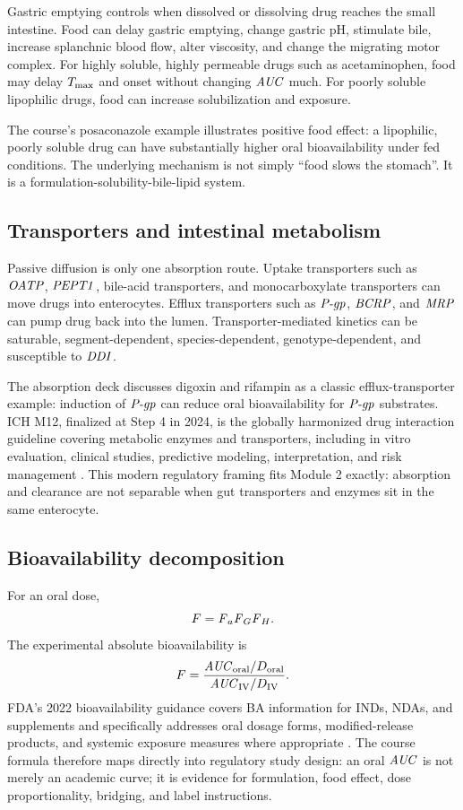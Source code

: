 \documentclass[a4paper]{article}
\newcommand{\AUC}{\ensuremath{\pksym{AUC}}}
\newcommand{\Tmax}{\ensuremath{T_{\pklab{max}}}}
\newcommand{\Fa}{\ensuremath{\pksym{F}_a}}
\newcommand{\Fg}{\ensuremath{\pksym{F}_G}}
\newcommand{\Fh}{\ensuremath{\pksym{F}_H}}
\newcommand{\Fbio}{\ensuremath{F}}
\newcommand{\DDI}{\ensuremath{\pksym{DDI}}}
\newcommand{\Pgp}{\ensuremath{\pksym{P-gp}}}
\newcommand{\OATP}{\ensuremath{\pksym{OATP}}}
\newcommand{\PEPT}{\ensuremath{\pksym{PEPT1}}}
\begin{document}
Gastric emptying controls when dissolved or dissolving drug reaches the small intestine. Food can delay gastric emptying, change gastric pH, stimulate bile, increase splanchnic blood flow, alter viscosity, and change the migrating motor complex. For highly soluble, highly permeable drugs such as acetaminophen, food may delay \(\Tmax\) and onset without changing \(\AUC\) much. For poorly soluble lipophilic drugs, food can increase solubilization and exposure.

The course's posaconazole example illustrates positive food effect: a lipophilic, poorly soluble drug can have substantially higher oral bioavailability under fed conditions. The underlying mechanism is not simply ``food slows the stomach''. It is a formulation-solubility-bile-lipid system.

\subsection{Transporters and intestinal metabolism}

Passive diffusion is only one absorption route. Uptake transporters such as \(\OATP\), \(\PEPT\), bile-acid transporters, and monocarboxylate transporters can move drugs into enterocytes. Efflux transporters such as \(\Pgp\), \(\pksym{BCRP}\), and \(\pksym{MRP}\) can pump drug back into the lumen. Transporter-mediated kinetics can be saturable, segment-dependent, species-dependent, genotype-dependent, and susceptible to \DDI{}.

The absorption deck discusses digoxin and rifampin as a classic efflux-transporter example: induction of \(\Pgp\) can reduce oral bioavailability for \(\Pgp\) substrates. ICH M12, finalized at Step 4 in 2024, is the globally harmonized drug interaction guideline covering metabolic enzymes and transporters, including in vitro evaluation, clinical studies, predictive modeling, interpretation, and risk management \cite{ichM12Ddi2024}. This modern regulatory framing fits Module 2 exactly: absorption and clearance are not separable when gut transporters and enzymes sit in the same enterocyte.

\subsection{Bioavailability decomposition}

For an oral dose,
\[
  \Fbio=\Fa\Fg\Fh.
\]
The experimental absolute bioavailability is
\[
  \Fbio
  =
  \frac{\AUC_{\pklab{oral}}/D_{\pklab{oral}}}
       {\AUC_{\pklab{IV}}/D_{\pklab{IV}}}.
\]
FDA's 2022 bioavailability guidance covers BA information for INDs, NDAs, and supplements and specifically addresses oral dosage forms, modified-release products, and systemic exposure measures where appropriate \cite{fda2022Bioavailability}. The course formula therefore maps directly into regulatory study design: an oral \(\AUC\) is not merely an academic curve; it is evidence for formulation, food effect, dose proportionality, bridging, and label instructions.
\end{document}
